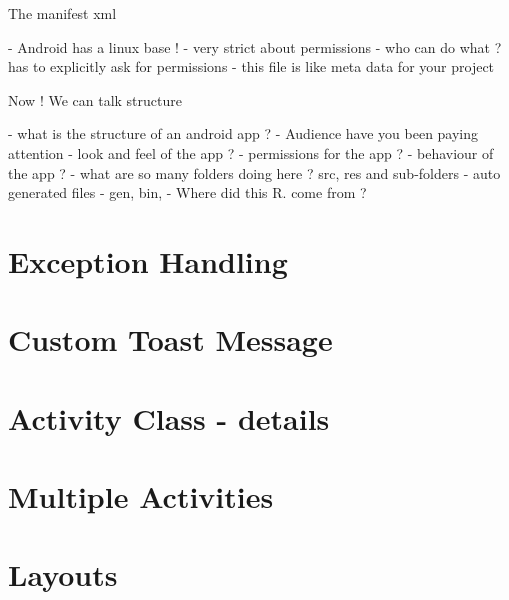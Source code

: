 \documentclass[11pt]{beamer}
\begin{document}
\begin{frame}[containsverbatim]{The manifest xml}

- Android has a linux base !
- very strict about permissions
- who can do what ? has to explicitly ask for permissions
- this file is like meta data for your project

\end{frame}

\begin{frame}[containsverbatim]{Now ! We can talk structure }

- what is the structure of an android app ?
- Audience have you been paying attention
- look and feel of the app ?
- permissions for the app ?
- behaviour of the app ?
- what are so many folders doing here ? 
	src, res and sub-folders
- auto generated files
- gen, bin, 
- Where did this R. come from ?

\end{frame}


\section{Exception Handling}


\section{Custom Toast Message}

\section{Activity Class - details}

\section{Multiple Activities}

\section{Layouts}


\end{document}
